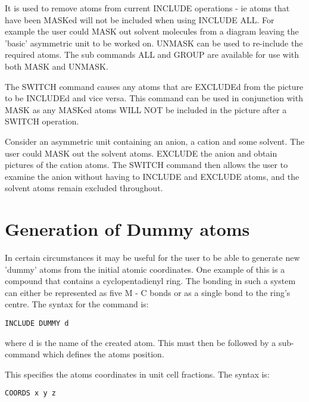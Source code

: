 \documentclass[10pt,a4paper]{report}
\begin{document}
It is used to remove atoms from current INCLUDE operations - ie atoms
that have been MASKed will not be included when using INCLUDE ALL. For
example the user could MASK out solvent molecules from a diagram leaving
the 'basic' asymmetric unit to be worked on. UNMASK can be used to
re-include the required atoms. The sub commands ALL and GROUP are
available for use with both MASK and UNMASK.


\bigskip{}




The SWITCH command causes any atoms that are EXCLUDEd from the picture
to be INCLUDEd and vice versa. This command can be used in conjunction
with MASK as any MASKed atoms WILL NOT be included in the picture after
a SWITCH operation.


Consider an asymmetric unit containing an anion, a cation and some
solvent. The user could MASK out the solvent atoms. EXCLUDE the anion
and obtain pictures of the cation atoms. The SWITCH command then
allows the user to examine the anion without having to INCLUDE and
EXCLUDE atoms, and the solvent atoms remain excluded throughout.
\section{Generation of Dummy atoms}


\bigskip{}




In certain circumstances it may be useful for the user to be
able to
generate new 'dummy' atoms from the initial atomic coordinates.
One
example of this is a compound that contains a cyclopentadienyl ring. The
bonding in
such a system can either be represented as five M - C bonds or
as a
single bond to the ring's centre. The syntax for the command is:
\small\begin{verbatim}
INCLUDE DUMMY d
\end{verbatim}\normalsize


where d is the name of the created atom. This must then be
followed by a
sub-command which defines the atoms position.


\bigskip{}
This specifies the atoms coordinates in unit cell fractions. The
syntax
is:
\small\begin{verbatim}
COORDS x y z
\end{verbatim}\normalsize


\end{document}

